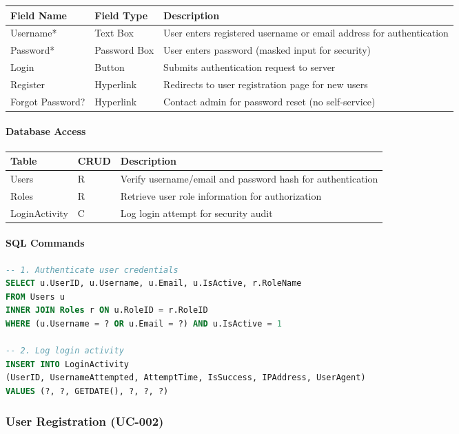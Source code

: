 \documentclass[12pt,a4paper]{article}
\begin{document}
\begin{longtable}{|p{3cm}|p{3cm}|p{8cm}|}
\hline
\textbf{Field Name} & \textbf{Field Type} & \textbf{Description} \\
\hline
Username* & Text Box & User enters registered username or email address for authentication \\
\hline
Password* & Password Box & User enters password (masked input for security) \\
\hline
Login & Button & Submits authentication request to server \\
\hline
Register & Hyperlink & Redirects to user registration page for new users \\
\hline
Forgot Password? & Hyperlink & Contact admin for password reset (no self-service) \\
\hline
\end{longtable}

\paragraph{Database Access}

\begin{longtable}{|p{3cm}|p{2cm}|p{9cm}|}
\hline
\textbf{Table} & \textbf{CRUD} & \textbf{Description} \\
\hline
Users & R & Verify username/email and password hash for authentication \\
\hline
Roles & R & Retrieve user role information for authorization \\
\hline
LoginActivity & C & Log login attempt for security audit \\
\hline
\end{longtable}

\paragraph{SQL Commands}

\begin{lstlisting}[language=SQL]
-- 1. Authenticate user credentials
SELECT u.UserID, u.Username, u.Email, u.IsActive, r.RoleName
FROM Users u 
INNER JOIN Roles r ON u.RoleID = r.RoleID
WHERE (u.Username = ? OR u.Email = ?) AND u.IsActive = 1

-- 2. Log login activity
INSERT INTO LoginActivity 
(UserID, UsernameAttempted, AttemptTime, IsSuccess, IPAddress, UserAgent)
VALUES (?, ?, GETDATE(), ?, ?, ?)
\end{lstlisting}

\subsubsection{User Registration (UC-002)}
\end{document}
